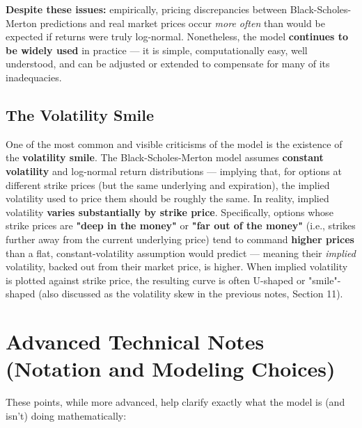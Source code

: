 \documentclass[12pt,openany]{book}
\theoremstyle{definition}
\theoremstyle{remark}
\begin{document}
\textbf{Despite these issues:} empirically, pricing discrepancies between Black-Scholes-Merton predictions and real market prices occur \emph{more often} than would be expected if returns were truly log-normal. Nonetheless, the model \textbf{continues to be widely used} in practice --- it is simple, computationally easy, well understood, and can be adjusted or extended to compensate for many of its inadequacies.

\subsection{The Volatility Smile}

One of the most common and visible criticisms of the model is the existence of the \textbf{volatility smile}. The Black-Scholes-Merton model assumes \textbf{constant volatility} and log-normal return distributions --- implying that, for options at different strike prices (but the same underlying and expiration), the implied volatility used to price them should be roughly the same. In reality, implied volatility \textbf{varies substantially by strike price}. Specifically, options whose strike prices are \textbf{"deep in the money"} or \textbf{"far out of the money"} (i.e., strikes further away from the current underlying price) tend to command \textbf{higher prices} than a flat, constant-volatility assumption would predict --- meaning their \emph{implied} volatility, backed out from their market price, is higher. When implied volatility is plotted against strike price, the resulting curve is often U-shaped or "smile"-shaped (also discussed as the volatility skew in the previous notes, Section 11).

\section{Advanced Technical Notes (Notation and Modeling Choices)}

These points, while more advanced, help clarify exactly what the model is (and isn't) doing mathematically:
\end{document}
